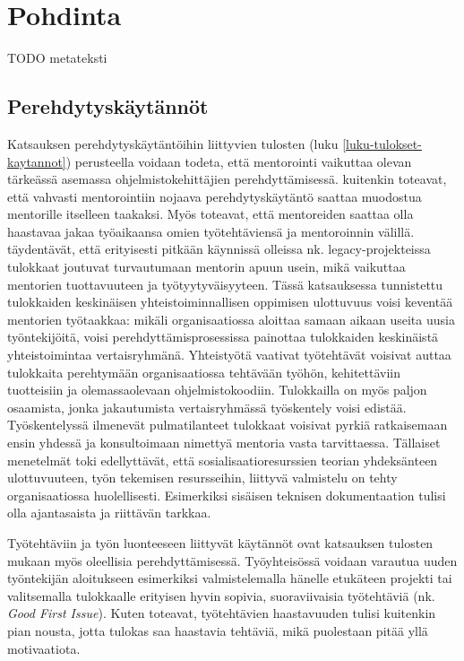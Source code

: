 \documentclass[utf8]{gradu3}
\begin{document}
\chapter{Pohdinta}
\label{paaluku-pohdinta}

TODO metateksti

\section{Perehdytyskäytännöt}

Katsauksen perehdytyskäytäntöihin liittyvien tulosten (luku \ref{luku-tulokset-kaytannot}) perusteella voidaan todeta, että mentorointi vaikuttaa olevan tärkeässä asemassa ohjelmistokehittäjien perehdyttämisessä. \textcite{viviani-murphy-2019} kuitenkin toteavat, että vahvasti mentorointiin nojaava perehdytyskäytäntö saattaa muodostua mentorille itselleen taakaksi. Myös \textcite{moe-ym-2020} toteavat, että mentoreiden saattaa olla haastavaa jakaa työaikaansa omien työtehtäviensä ja mentoroinnin välillä. \textcite{britto-ym-2017} täydentävät, että erityisesti pitkään käynnissä olleissa nk. legacy-projekteissa tulokkaat joutuvat turvautumaan mentorin apuun usein, mikä vaikuttaa mentorien tuottavuuteen ja työtyytyväisyyteen. Tässä katsauksessa tunnistettu tulokkaiden keskinäisen yhteistoiminnallisen oppimisen ulottuvuus voisi keventää mentorien työtaakkaa: mikäli organisaatiossa aloittaa samaan aikaan useita uusia työntekijöitä, voisi perehdyttämisprosessissa painottaa tulokkaiden keskinäistä yhteistoimintaa vertaisryhmänä. Yhteistyötä vaativat työtehtävät voisivat auttaa tulokkaita perehtymään organisaatiossa tehtävään työhön, kehitettäviin tuotteisiin ja olemassaolevaan ohjelmistokoodiin. Tulokkailla on myös paljon osaamista, jonka jakautumista vertaisryhmässä työskentely voisi edistää. Työskentelyssä ilmenevät pulmatilanteet tulokkaat voisivat pyrkiä ratkaisemaan ensin yhdessä ja konsultoimaan nimettyä mentoria vasta tarvittaessa. Tällaiset menetelmät toki edellyttävät, että sosialisaatioresurssien teorian yhdeksänteen ulottuvuuteen, työn tekemisen resursseihin, liittyvä valmistelu on tehty organisaatiossa huolellisesti. Esimerkiksi sisäisen teknisen dokumentaation tulisi olla ajantasaista ja riittävän tarkkaa.

Työtehtäviin ja työn luonteeseen liittyvät käytännöt ovat katsauksen tulosten mukaan myös oleellisia perehdyttämisessä. Työyhteisössä voidaan varautua uuden työntekijän aloitukseen esimerkiksi valmistelemalla hänelle etukäteen projekti tai valitsemalla tulokkaalle erityisen hyvin sopivia, suoraviivaisia työtehtäviä (nk. \textit{Good First Issue}). Kuten \textcite{ju-ym-2021} toteavat, työtehtävien haastavuuden tulisi kuitenkin pian nousta, jotta tulokas saa haastavia tehtäviä, mikä puolestaan pitää yllä motivaatiota.
\end{document}
